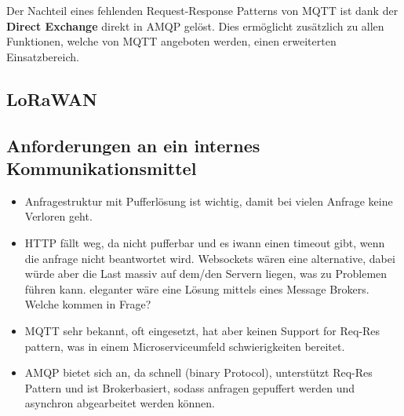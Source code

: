 Der Nachteil eines fehlenden Request-Response Patterns von \ac{MQTT} ist dank der \textbf{Direct Exchange} direkt in \ac{AMQP} gelöst. Dies ermöglicht zusätzlich zu allen Funktionen, welche von \ac{MQTT} angeboten werden, einen erweiterten Einsatzbereich.

\subsection{LoRaWAN}
\subsection{Anforderungen an ein internes Kommunikationsmittel}

\begin{itemize}
    \item Anfragestruktur mit Pufferlösung ist wichtig, damit bei vielen Anfrage keine Verloren geht.
    \item HTTP fällt weg, da nicht pufferbar und es iwann einen timeout gibt, wenn die anfrage nicht beantwortet wird. Websockets wären eine alternative, dabei würde aber die Last massiv auf dem/den Servern liegen, was zu Problemen führen kann. eleganter wäre eine Lösung mittels eines Message Brokers. Welche kommen in Frage?
    \item MQTT sehr bekannt, oft eingesetzt, hat aber keinen Support for Req-Res pattern, was in einem Microserviceumfeld schwierigkeiten bereitet.
    \item AMQP bietet sich an, da schnell (binary Protocol), unterstützt Req-Res Pattern und ist Brokerbasiert, sodass anfragen gepuffert werden und asynchron abgearbeitet werden können.
\end{itemize}

